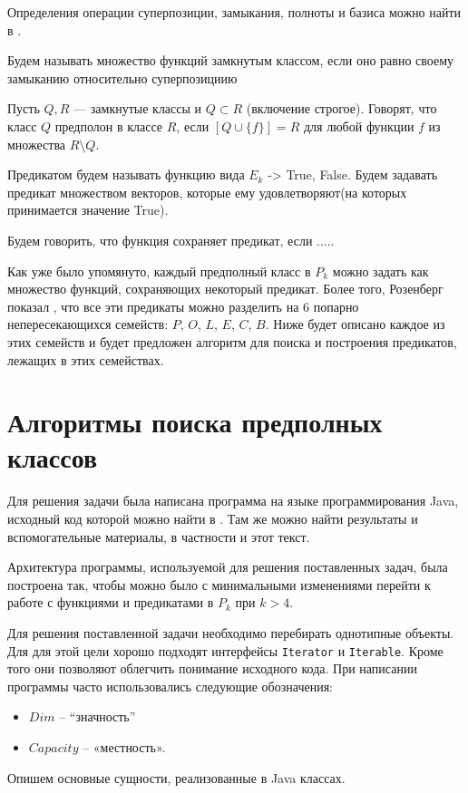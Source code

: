 \documentclass[a4paper,14pt]{extreport}
\begin{document}
Определения операции суперпозиции, замыкания, полноты и базиса можно найти в \cite{march}.

Будем называть множество функций замкнутым классом, если оно равно своему замыканию относительно суперпозициию

Пусть $Q, R$ — замкнутые классы и $Q \subset R$ (включение строгое). 
Говорят, что класс $Q$ предполон в классе $R$, если $[Q \cup \{f\}] = R$ для 
любой функции $f$ из множества $R \setminus Q$. 

Предикатом будем называть функцию вида $E_k$ -> {True, False}. Будем задавать предикат множеством векторов, которые ему удовлетворяют(на которых принимается значение True).

Будем говорить, что функция сохраняет предикат, если .....

Как уже было упомянуто, каждый предполный класс в $P_k$ можно задать как множество функций, сохраняющих некоторый предикат. Более того, Розенберг показал \cite{roz1, roz2}, что все эти предикаты можно разделить на 6 попарно непересекающихся семейств: $P$, $O$, $L$, $E$, $C$, $B$. Ниже будет описано каждое из этих семейств и будет предложен алгоритм для поиска и построения предикатов, лежащих в этих семействах.

\section{Алгоритмы поиска предполных классов}
Для решения задачи была написана программа на языке программирования Java, исходный код которой можно найти в \cite{git}. Там же можно найти результаты и вспомогательные материалы, в частности и этот текст.

Архитектура программы, используемой для решения поставленных задач, была построена так, чтобы можно было с минимальными изменениями перейти к работе с функциями и предикатами в $P_k$ при $k > 4$.
 
Для решения поставленной задачи необходимо перебирать однотипные объекты. Для для этой цели хорошо подходят интерфейсы {\tt Iterator} и {\tt Iterable}. Кроме того они позволяют облегчить понимание исходного кода.
При написании программы часто использовались следующие обозначения:
\begin{itemize}
\item$Dim$ – “значность”
\item$Capacity$ – «местность».  
\end{itemize} 

Опишем основные сущности, реализованные в Java классах.
\end{document}
